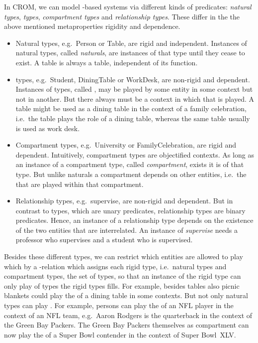 In CROM, we can model \rosirole-based systems via different kinds of predicates: \emph{natural types},
\emph{\rosirole types}, \emph{compartment types} and \emph{relationship types}. These differ in the
the above mentioned metaproperties rigidity and dependence.
\begin{itemize}
\item Natural types, e.g.\ \textsf{Person} or \textsf{Table}, are rigid and independent. Instances
  of natural types, called \emph{naturals}, are instances of that type until they cease to exist. A
  table is always a table, independent of its function.
\item \Rosirole types, e.g.\ \textsf{Student}, \textsf{DiningTable} or \textsf{WorkDesk}, are
  non-rigid and dependent. Instances of \rosirole types, called \emph{\rosiroles}, may be played by
  some entity in some context but not in another. But there always must be a context in which that
  \rosirole is played.  A table might be used as a dining table in the context of a family
  celebration, i.e.\ the table plays the role of a dining table, whereas the same table usually is
  used as work desk.
\item Compartment types, e.g.\ \textsf{University} or \textsf{FamilyCelebration}, are rigid and
  dependent. Intuitively, compartment types are objectified contexts. As long as an instance of a
  compartment type, called \emph{compartment}, exists it is of that type. But unlike naturals a
  compartment depends on other entities, i.e.\ the \rosiroles that are played within that
  compartment.
\item Relationship types, e.g.\ \textsf{supervise}, are non-rigid and dependent. But in contrast to
  \rosirole types, which are unary predicates, relationship types are binary predicates. Hence, an
  instance of a relationship type depends on the existence of the two entities that are
  interrelated.  An instance of \emph{supervise} needs a professor who supervises and a student who
  is supervised.
\end{itemize}

Besides these different types, we can restrict which entities are allowed to play which \rosiroles
by a \fills-relation which assigns each rigid type, i.e.\ natural types and compartment types, the
set of \rosirole types, so that an instance of the rigid type can only play \rosiroles of \rosirole
types the rigid types fills. For example, besides tables also picnic blankets could play the
\rosirole of a dining table in some contexts. But not only natural types can play \rosiroles. For
example, persons can play the \rosirole of an NFL player in the context of an NFL team, e.g.\ Aaron
Rodgers is the quarterback in the context of the Green Bay Packers. The Green Bay Packers themselves
as compartment can now play the \rosirole of a Super Bowl contender in the context of Super Bowl~XLV.

